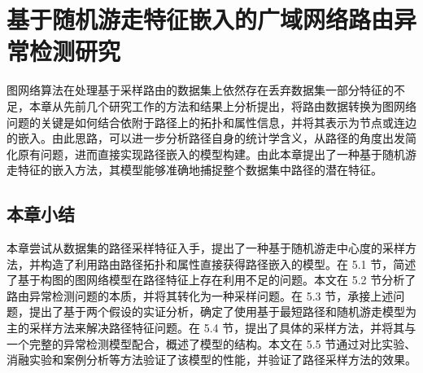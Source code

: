 
\chapter{基于随机游走特征嵌入的广域网络路由异常检测研究}

图网络算法在处理基于采样路由的数据集上依然存在丢弃数据集一部分特征的不足，本章从先前几个研究工作的方法和结果上分析提出，将路由数据转换为图网络问题的关键是如何结合依附于路径上的拓扑和属性信息，并将其表示为节点或连边的嵌入。由此思路，可以进一步分析路径自身的统计学含义，从路径的角度出发简化原有问题，进而直接实现路径嵌入的模型构建。由此本章提出了一种基于随机游走特征的嵌入方法，其模型能够准确地捕捉整个数据集中路径的潜在特征。












\section{本章小结}

本章尝试从数据集的路径采样特征入手，提出了一种基于随机游走中心度的采样方法，并构造了利用路由路径拓扑和属性直接获得路径嵌入的模型。在 5.1 节，简述了基于构图的图网络模型在路径特征上存在利用不足的问题。本文在 5.2 节分析了路由异常检测问题的本质，并将其转化为一种采样问题。在 5.3 节，承接上述问题，提出了基于两个假设的实证分析，确定了使用基于最短路径和随机游走模型为主的采样方法来解决路径特征问题。在 5.4 节，提出了具体的采样方法，并将其与一个完整的异常检测模型配合，概述了模型的结构。本文在 5.5 节通过对比实验、消融实验和案例分析等方法验证了该模型的性能，并验证了路径采样方法的效果。

